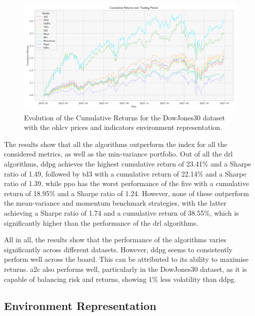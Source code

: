 \begin{figure}
    \centering
    \includegraphics[width=\textwidth]{figures/dowjones30_indicators_cumulative_returns.png}
    \caption{Evolution of the Cumulative Returns for the DowJones30 dataset with the \acrshort{ohlcv} prices and indicators environment representation.}
    \label{fig:dowjones30_indicators_cumulative_returns}
\end{figure}



The results show that all the algorithms outperform the index for all the considered metrics, as well as the min-variance portfolio. Out of all the \acrshort{drl} algorithms, \acrshort{ddpg} achieves the highest cumulative return of 23.41\% and a Sharpe ratio of 1.49, followed by \acrshort{td3} with a cumulative return of 22.14\% and a Sharpe ratio of 1.39, while \acrshort{ppo} has the worst performance of the five with a cumulative return of 18.95\% and a Sharpe ratio of 1.24. However, none of these outperform the mean-variance and momentum benchmark strategies, with the latter achieving a Sharpe ratio of 1.74 and a cumulative return of 38.55\%, which is significantly higher than the performance of the \acrshort{drl} algorithms. 

All in all, the results show that the performance of the algorithms varies significantly across different datasets. However, \acrshort{ddpg} seems to consistently perform well across the board. This can be attributed to its ability to maximise returns. \acrshort{a2c} also performs well, particularly in the DowJones30 dataset, as it is capable of balancing risk and returns, showing 1\% less volatility than \acrshort{ddpg}. 

\subsection{Environment Representation} \label{sec:environment-representation}

